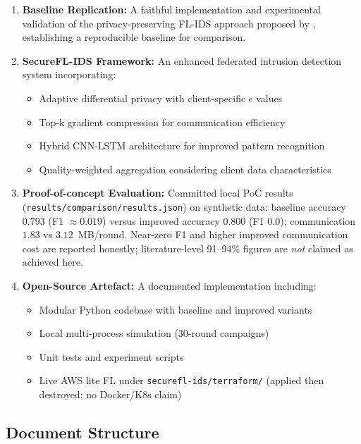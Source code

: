 \begin{enumerate}
    \item \textbf{Baseline Replication:} A faithful implementation and experimental validation of the privacy-preserving FL-IDS approach proposed by \citet{saklani2026privacy}, establishing a reproducible baseline for comparison.
    
    \item \textbf{SecureFL-IDS Framework:} An enhanced federated intrusion detection system incorporating:
    \begin{itemize}
        \item Adaptive differential privacy with client-specific $\epsilon$ values
        \item Top-k gradient compression for communication efficiency
        \item Hybrid CNN-LSTM architecture for improved pattern recognition
        \item Quality-weighted aggregation considering client data characteristics
    \end{itemize}
    
    \item \textbf{Proof-of-concept Evaluation:} Committed local PoC results (\texttt{results/comparison/results.json}) on synthetic data: baseline accuracy $0.793$ (F1 $\approx 0.019$) versus improved accuracy $0.800$ (F1 $0.0$); communication $1.83$ vs $3.12$~MB/round. Near-zero F1 and higher improved communication cost are reported honestly; literature-level 91--94\% figures are \emph{not} claimed as achieved here.
    
    \item \textbf{Open-Source Artefact:} A documented implementation including:
    \begin{itemize}
        \item Modular Python codebase with baseline and improved variants
        \item Local multi-process simulation (30-round campaigns)
        \item Unit tests and experiment scripts
        \item Live AWS lite FL under \texttt{securefl-ids/terraform/} (applied then destroyed; no Docker/K8s claim)
    \end{itemize}
\end{enumerate}

\subsection{Document Structure}

